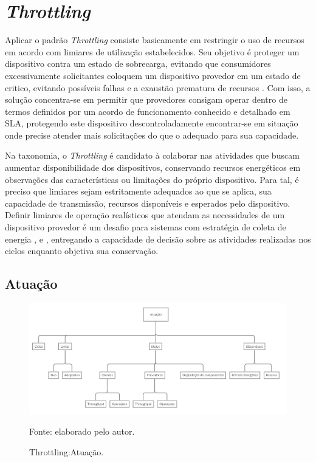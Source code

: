 \section{\textit{Throttling}}

Aplicar o padrão \textit{Throttling} consiste basicamente em restringir o uso de recursos em acordo com limiares de utilização estabelecidos. Seu objetivo é proteger um dispositivo contra um estado de sobrecarga, evitando que consumidores excessivamente solicitantes coloquem um dispositivo provedor em um estado de critico, evitando possíveis falhas e a exaustão prematura de recursos \cite{martinekuan_throttling_nodate}. Com isso, a solução concentra-se em permitir que provedores consigam operar dentro de termos definidos por um acordo de funcionamento conhecido e detalhado em \acs{SLA}, protegendo este dispositivo descontroladamente encontrar-se em situação onde precise atender mais solicitações do que o adequado para sua capacidade.

Na taxonomia, o \textit{Throttling} é candidato à colaborar nas atividades que buscam aumentar disponibilidade dos dispositivos, conservando recursos energéticos em observações das características ou limitações do próprio dispositivo. Para tal, é preciso que limiares sejam estritamente adequados ao que se aplica, sua capacidade de transmissão, recursos disponíveis e esperados pelo dispositivo. Definir limiares de operação realísticos que atendam as necessidades de um dispositivo provedor é um desafio para sistemas com estratégia de coleta de energia \cite{khairnar_discrete-rate_2015}, \cite{liu_energy_2016} e \cite{zhang_toward_2018}, entregando a capacidade de decisão sobre as atividades realizadas nos ciclos enquanto objetiva sua conservação.

\subsection{Atuação}
\label{cap4:atuação}

\begin{figure}[hbt]
	\centering
	\caption{Throttling:Atuação.}
	\label{fig:taxonomia_atuacao}
	\includegraphics[width=1\textwidth]{Imagens/cap4/cap4taxonomia_throttling_atuacao.jpg}	
	
	Fonte: elaborado pelo autor.
\end{figure}

